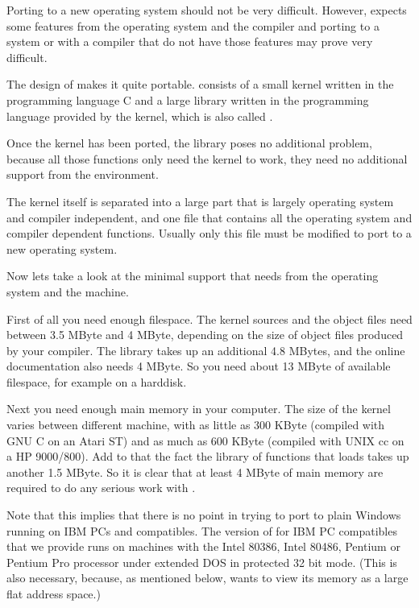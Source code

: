 Porting {\GAP} to a new  operating system should  not be very  difficult.
However,  {\GAP} expects some features  from the operating system and the
compiler  and porting {\GAP}  to a system or with  a compiler that do not
have those features may prove very difficult.

The design of {\GAP} makes it quite portable.  {\GAP} consists of a small
kernel written in the programming language  C and a large library written
in the programming language provided by  the {\GAP} kernel, which is also
called {\GAP}.

Once the kernel has been ported, the library poses no additional problem,
because  all those functions only  need the kernel to  work, they need no
additional support from the environment.

The kernel  itself  is  separated  into a  large   part that  is  largely
operating system and compiler independent, and one file that contains all
the operating system and compiler dependent functions.  Usually only this
file must be modified to port {\GAP} to a new operating system.

Now lets take a  look at the  minimal support that  {\GAP} needs from the
operating system and the machine.

First of all  you need  enough filespace.    The kernel sources  and  the
object files need between 3.5 MByte and 4 MByte, depending on the size of
object files   produced   by your compiler.   The  library   takes  up an
additional  4.8 MBytes, and the online  documentation also needs 4 MByte.
So you  need about 13   MByte of available   filespace, for example on  a
harddisk.

Next  you need enough main  memory  in your computer.   The  size of  the
{\GAP}  kernel varies between  different machine,  with  as little as 300
KByte (compiled with  GNU C on an   Atari ST) and  as  much as 600  KByte
(compiled   with UNIX cc on  a  HP 9000/800).  Add   to that the fact the
library of functions that {\GAP} loads takes up another 1.5 MByte.  So it
is  clear that at least  4 MByte  of main memory  are required  to do any
serious work with {\GAP}.

Note that this implies that there is no point in trying to port {\GAP} to
plain Windows  running on IBM PCs  and compatibles.  The version of {\GAP}
for IBM  PC compatibles that we provide  runs on machines  with the Intel
80386, Intel 80486,  Pentium or Pentium Pro  processor under extended DOS
in protected 32 bit mode.  (This is also necessary, because, as mentioned
below, {\GAP} wants to view its memory as a large flat address space.)

